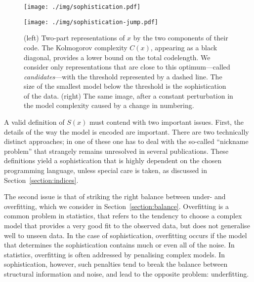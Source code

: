 \begin{figure*}[tb]
  \vspace{-2\baselineskip}
  \centering
  \begin{minipage}{0.40\textwidth}
     \texttt{[image: ./img/sophistication.pdf]}
  \end{minipage}
  \begin{minipage}{0.40\textwidth}
     \texttt{[image: ./img/sophistication-jump.pdf]}
  \end{minipage}
  \caption{\small (left) Two-part representations of $x$ by the two components of their code. The Kolmogorov complexity $C(x)$, appearing as a black diagonal, provides a lower bound on the total codelength. We consider only representations that are close to this optimum---called \emph{candidates}---with the threshold represented by a dashed line. The size of the smallest model below the threshold is the sophistication of the data. (right) The same image, after a constant perturbation in the model complexity caused by a change in numbering.}
  \label{fig:diagram}
\end{figure*}\enlargethispage{3\baselineskip}

A valid definition of $S(x)$ must contend with two important issues. First, the details of the way the model is encoded are important. There are two technically distinct approaches; in one of these one has to deal with the so-called ``nickname problem'' that strangely remains unresolved in several publications. These definitions yield a sophistication that is highly dependent on the chosen programming language, unless special care is taken, as discussed in Section~\ref{section:indices}.

The second issue is that of striking the right balance between under- and overfitting, which we consider in Section~\ref{section:balance}. Overfitting is a common problem in statistics, that refers to the tendency to choose a complex model that provides a very good fit to the observed data, but does not generalise well to unseen data. In the case of sophistication, overfitting occurs if the model that determines the sophistication contains much or even all of the noise. In statistics, overfitting is often addressed by penalising complex models. In sophistication, however, such penalties tend to break the balance between structural information and noise, and lead to the opposite problem: underfitting.

